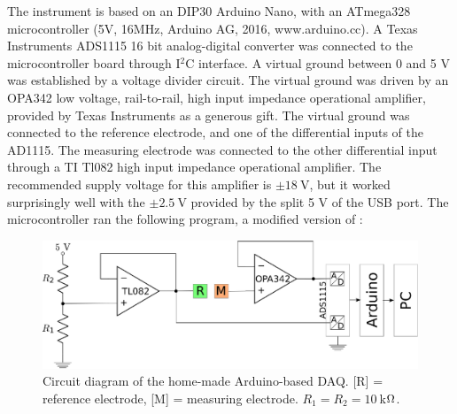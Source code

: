 The instrument is based on an DIP30 Arduino Nano, with an ATmega328 microcontroller (5V, 16MHz, Arduino AG, 2016, www.arduino.cc). A Texas Instruments ADS1115 16 bit analog-digital converter was connected to the microcontroller board through I$^2$C interface. A virtual ground between 0 and 5 V was established by a voltage divider circuit. The virtual ground was driven by an OPA342 low voltage, rail-to-rail, high input impedance operational amplifier, provided by Texas Instruments as a generous gift. The virtual ground was connected to the reference electrode, and one of the differential inputs of the AD1115. The measuring electrode was connected to the other differential input through a TI Tl082 high input impedance operational amplifier. The recommended supply voltage for this amplifier is $\pm 18~$V, but it worked surprisingly well with the $\pm 2.5~$V provided by the split 5 V of the USB port. The microcontroller ran the following program, a modified version of \cite{ads}: 

\begin{figure}
\centering
% 
%
%
\includegraphics[width=1\textwidth]{img/arduino.eps}
\caption[Circuit diagram of the home-made Arduino-based DAQ.]{Circuit diagram of the home-made Arduino-based DAQ. [R] = reference electrode, [M] = measuring electrode. $R_1 = R_2 = 10~$k$\ohm$.}
\label{fig:daq_circuit}
\end{figure}

